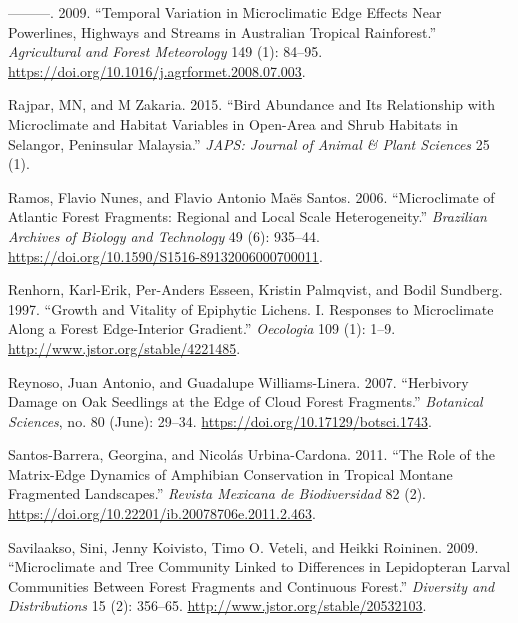 \documentclass[
  12pt,
]{article}
\newlength{\cslhangindent}
\newenvironment{CSLReferences}[2] %
 {\begin{list}{}{%
  \setlength{\itemindent}{0pt}
  \setlength{\leftmargin}{0pt}
  \setlength{\parsep}{0pt}
  \ifodd #1
   \setlength{\leftmargin}{\cslhangindent}
   \setlength{\itemindent}{-1\cslhangindent}
  \fi
  \setlength{\itemsep}{#2\baselineskip}}}
 {\end{list}}
\begin{document}
\begin{CSLReferences}{1}{0}
---------. 2009. {``Temporal Variation in Microclimatic Edge Effects
Near Powerlines, Highways and Streams in {Australian} Tropical
Rainforest.''} \emph{Agricultural and Forest Meteorology} 149 (1):
84--95. \url{https://doi.org/10.1016/j.agrformet.2008.07.003}.

Rajpar, MN, and M Zakaria. 2015. {``Bird Abundance and Its Relationship
with Microclimate and Habitat Variables in Open-Area and Shrub Habitats
in {Selangor}, {Peninsular} {Malaysia}.''} \emph{JAPS: Journal of Animal
\& Plant Sciences} 25 (1).

Ramos, Flavio Nunes, and Flavio Antonio Maës Santos. 2006.
{``Microclimate of {Atlantic} Forest Fragments: Regional and Local Scale
Heterogeneity.''} \emph{Brazilian Archives of Biology and Technology} 49
(6): 935--44. \url{https://doi.org/10.1590/S1516-89132006000700011}.

Renhorn, Karl-Erik, Per-Anders Esseen, Kristin Palmqvist, and Bodil
Sundberg. 1997. {``Growth and {Vitality} of {Epiphytic} {Lichens}. {I}.
{Responses} to {Microclimate} Along a {Forest} {Edge}-{Interior}
{Gradient}.''} \emph{Oecologia} 109 (1): 1--9.
\url{http://www.jstor.org/stable/4221485}.

Reynoso, Juan Antonio, and Guadalupe Williams-Linera. 2007. {``Herbivory
Damage on Oak Seedlings at the Edge of Cloud Forest Fragments.''}
\emph{Botanical Sciences}, no. 80 (June): 29--34.
\url{https://doi.org/10.17129/botsci.1743}.

Santos-Barrera, Georgina, and Nicolás Urbina-Cardona. 2011. {``The Role
of the Matrix-Edge Dynamics of Amphibian Conservation in Tropical
Montane Fragmented Landscapes.''} \emph{Revista Mexicana de
Biodiversidad} 82 (2).
\url{https://doi.org/10.22201/ib.20078706e.2011.2.463}.

Savilaakso, Sini, Jenny Koivisto, Timo O. Veteli, and Heikki Roininen.
2009. {``Microclimate and {Tree} {Community} {Linked} to {Differences}
in {Lepidopteran} {Larval} {Communities} Between {Forest} {Fragments}
and {Continuous} {Forest}.''} \emph{Diversity and Distributions} 15 (2):
356--65. \url{http://www.jstor.org/stable/20532103}.


\end{CSLReferences}
\end{document}

